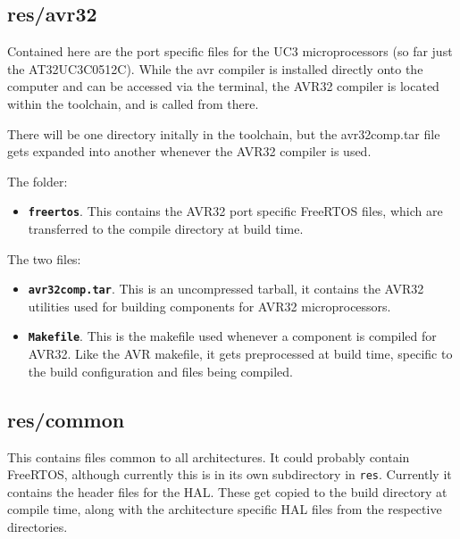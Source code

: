 \documentclass[a4paper, oneside, 11pt, titlepage, onecolumn, openright]{report}
\begin{document}
\subsection{res/avr32}
			\label{ss:res/avr32}
			
Contained here are the port specific files for the UC3 microprocessors (so far just the AT32UC3C0512C).
While the avr compiler is installed directly onto the computer and can be accessed via the terminal, the AVR32 compiler is located within the toolchain, and is called from there. 

There will be one directory initally in the toolchain, but the avr32comp.tar file gets expanded into another whenever the AVR32 compiler is used.

The folder:

\begin{itemize}

\item \textbf{\texttt{freertos}}. This contains the AVR32 port specific FreeRTOS files, which are transferred to the compile directory at build time.

\end{itemize}

The two files:

\begin{itemize}

\item \textbf{\texttt{avr32comp.tar}}. This is an uncompressed tarball, it contains the AVR32 utilities used for building components for AVR32 microprocessors.

\item \textbf{\texttt{Makefile}}. This is the makefile used whenever a component is compiled for AVR32. Like the AVR makefile, it gets preprocessed at build time, specific to the build configuration and files being compiled.

\end{itemize}

\subsection{res/common}
			\label{ss:res/commmon}
			This contains files common to all architectures. It could probably contain FreeRTOS, although currently this is in its own subdirectory in \texttt{res}. Currently it contains the header files for the HAL. These get copied to the build directory at compile time, along with the architecture specific HAL files from the respective directories.
			
\end{document}
